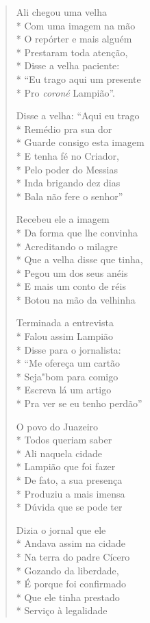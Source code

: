 \begin{verse}
Ali chegou uma velha\\*
Com uma imagem na mão\\*
O repórter e mais alguém\\*
Prestaram toda atenção,\\*
Disse a velha paciente:\\*
``Eu trago aqui um presente\\*
Pro \textit{coroné} Lampião''.

Disse a velha: ``Aqui eu trago\\*
Remédio pra sua dor\\*
Guarde consigo esta imagem\\*
E tenha fé no Criador,\\*
Pelo poder do Messias\\*
Inda brigando dez dias\\*
Bala não fere o senhor''

Recebeu ele a imagem\\*
Da forma que lhe convinha\\*
Acreditando o milagre\\*
Que a velha disse que tinha,\\*
Pegou um dos seus anéis\\*
E mais um conto de réis\\*
Botou na mão da velhinha

Terminada a entrevista\\*
Falou assim Lampião\\*
Disse para o jornalista:\\*
``Me ofereça um cartão\\*
Seja"bom para comigo\\*
Escreva lá um artigo\\*
Pra ver se eu tenho perdão''

O povo do Juazeiro\\*
Todos queriam saber\\*
Ali naquela cidade\\*
Lampião que foi fazer\\*
De fato, a sua presença\\*
Produziu a mais imensa\\*
Dúvida que se pode ter

Dizia o jornal que ele\\*
Andava assim na cidade\\*
Na terra do padre Cícero\\*
Gozando da liberdade,\\*
É porque foi confirmado\\*
Que ele tinha prestado\\*
Serviço à legalidade


\end{verse}

